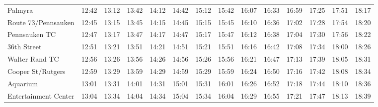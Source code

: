 \begin{center}
\begin{tabular}{@{}lrrrrrrrrrrrrr@{}}
Palmyra & 12:42 & 13:12 & 13:42 & 14:12 & 14:42 & 15:12 & 15:42 & 16:07 & 16:33 & 16:59 & 17:25 & 17:51 & 18:17 \\
Route 73/Pennsauken & 12:45 & 13:15 & 13:45 & 14:15 & 14:45 & 15:15 & 15:45 & 16:10 & 16:36 & 17:02 & 17:28 & 17:54 & 18:20 \\
Pennsauken TC & 12:47 & 13:17 & 13:47 & 14:17 & 14:47 & 15:17 & 15:47 & 16:12 & 16:38 & 17:04 & 17:30 & 17:56 & 18:22 \\
36th Street & 12:51 & 13:21 & 13:51 & 14:21 & 14:51 & 15:21 & 15:51 & 16:16 & 16:42 & 17:08 & 17:34 & 18:00 & 18:26 \\
Walter Rand TC & 12:56 & 13:26 & 13:56 & 14:26 & 14:56 & 15:26 & 15:56 & 16:21 & 16:47 & 17:13 & 17:39 & 18:05 & 18:31 \\
Cooper St/Rutgers & 12:59 & 13:29 & 13:59 & 14:29 & 14:59 & 15:29 & 15:59 & 16:24 & 16:50 & 17:16 & 17:42 & 18:08 & 18:34 \\
Aquarium & 13:01 & 13:31 & 14:01 & 14:31 & 15:01 & 15:31 & 16:01 & 16:26 & 16:52 & 17:18 & 17:44 & 18:10 & 18:36 \\
Entertainment Center & 13:04 & 13:34 & 14:04 & 14:34 & 15:04 & 15:34 & 16:04 & 16:29 & 16:55 & 17:21 & 17:47 & 18:13 & 18:39 \\
\bottomrule\end{tabular}\end{center}
